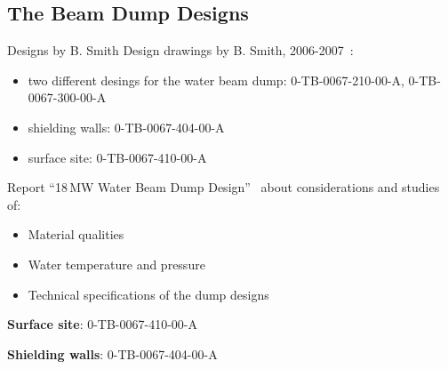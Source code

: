 \documentclass[xcolor={dvipsnames}]{beamer}
\begin{document}
\subsection{The Beam Dump Designs}
\begin{frame}{Designs by B. Smith}
Design drawings by B. Smith, 2006-2007~\cite{Smith}:
\begin{itemize}
 \item two different desings for the water beam dump: 0-TB-0067-210-00-A, 0-TB-0067-300-00-A
 \item shielding walls: 0-TB-0067-404-00-A
 \item surface site: 0-TB-0067-410-00-A
\end{itemize}
Report ``18\,MW Water Beam Dump Design''~\cite{Smith_Report} about considerations and studies of:
\begin{itemize}
 \item Material qualities
 \item Water temperature and pressure
 \item Technical specifications of the dump designs
\end{itemize}
\end{frame}

\begin{frame}{\textbf{Surface site}: 0-TB-0067-410-00-A}
\centering
{}
\end{frame}
\begin{frame}{\textbf{Shielding walls}: 0-TB-0067-404-00-A}
\centering
{}
\end{frame}
\end{document}
